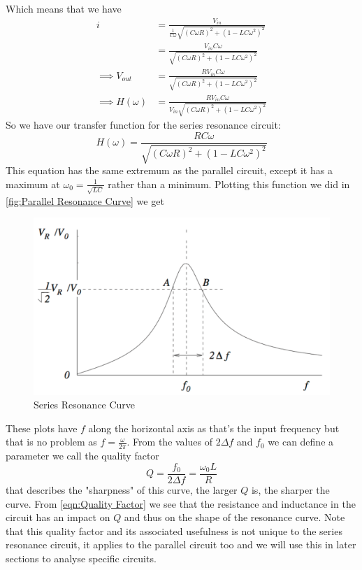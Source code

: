 \documentclass[12pt]{article}
\numberwithin{equation}{section}
\numberwithin{figure}{section}
\begin{document}
    Which means that we have 
    \begin{align*}
        i&=\frac{V_{in}}{\frac{1}{C\omega}\sqrt{(C\omega R)^2+(1-LC\omega^2)^2}}\\
        &=\frac{V_{in}C\omega}{\sqrt{(C\omega R)^2+(1-LC\omega^2)^2}}\\
        \implies V_{out}&=\frac{RV_{in}C\omega}{\sqrt{(C\omega R)^2+(1-LC\omega^2)^2}}\\
        \implies H(\omega)&=\frac{RV_{in}C\omega}{V_{in}\sqrt{(C\omega R)^2+(1-LC\omega^2)^2}}
    \end{align*}
    So we have our transfer function for the series resonance circuit:
    \begin{equation}
        H(\omega)=\frac{RC\omega}{\sqrt{(C\omega R)^2+(1-LC\omega^2)^2}}
        \label{eqn:Series Transfer Function}
    \end{equation}
    This equation has the same extremum as the parallel circuit, except it has a maximum at 
    $\omega_0=\frac{1}{\sqrt{LC}}$ rather than a minimum. Plotting this function we did in 
    \autoref{fig:Parallel Resonance Curve} we get 
    \begin{figure}[H]
        \begin{center}
           \includegraphics[width=.65\textwidth]{SeriesResonanceCurve.png}
           \caption{Series Resonance Curve}
           \label{fig:Series Resonance Curve}
        \end{center}
    \end{figure}
    These plots have $f$ along the horizontal axis as that's the input frequency but that is no problem 
    as $f=\frac{\omega}{2\pi}$. From the values of $2\Delta f$ and $f_0$ we can define a parameter 
    we call the quality factor 
    \begin{equation*}
        Q=\frac{f_0}{2\Delta f}=\frac{\omega_0L}{R}
        \label{eqn:Quality Factor}
    \end{equation*}
    that describes the "sharpness" of this curve, the larger $Q$ is, the sharper the curve. From 
    \autoref{eqn:Quality Factor} we see that the resistance and inductance in the circuit has an 
    impact on $Q$ and thus on the shape of the resonance curve. Note that this quality factor and its 
    associated usefulness is not unique to the series resonance circuit, it applies to the parallel 
    circuit too and we will use this in later sections to analyse specific circuits.
\end{document}

